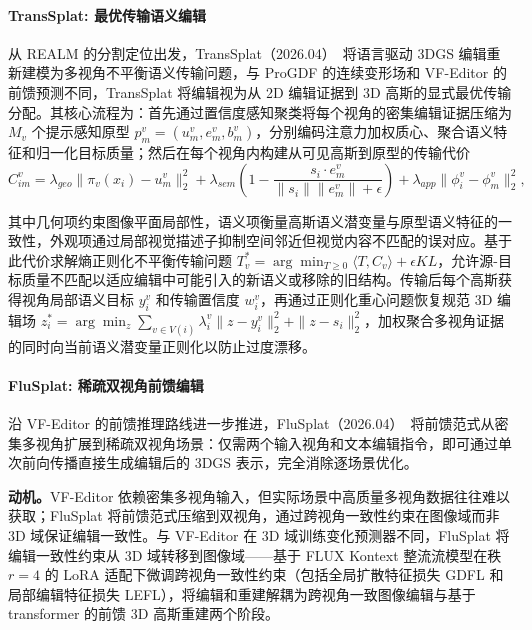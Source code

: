 \paragraph{TransSplat: 最优传输语义编辑}

从 REALM 的分割定位出发，TransSplat（2026.04）~\cite{2604_19571}将语言驱动 3DGS 编辑重新建模为多视角不平衡语义传输问题，与 ProGDF 的连续变形场和 VF-Editor 的前馈预测不同，TransSplat 将编辑视为从 2D 编辑证据到 3D 高斯的显式最优传输分配。其核心流程为：首先通过置信度感知聚类将每个视角的密集编辑证据压缩为 $M_v$ 个提示感知原型 $p_m^v = (u_m^v, e_m^v, b_m^v)$，分别编码注意力加权质心、聚合语义特征和归一化目标质量；然后在每个视角内构建从可见高斯到原型的传输代价
\begin{equation}
C_{im}^v = \lambda_{geo}\|\pi_v(x_i) - u_m^v\|_2^2 + \lambda_{sem}(1 - \frac{s_i \cdot e_m^v}{\|s_i\|\|e_m^v\| + \epsilon}) + \lambda_{app}\|\phi_i^v - \phi_m^v\|_2^2,
\end{equation}

其中几何项约束图像平面局部性，语义项衡量高斯语义潜变量与原型语义特征的一致性，外观项通过局部视觉描述子抑制空间邻近但视觉内容不匹配的误对应。基于此代价求解熵正则化不平衡传输问题 $T_v^* = \arg\min_{T \geq 0} \langle T, C_v \rangle + \epsilon KL$，允许源-目标质量不匹配以适应编辑中可能引入的新语义或移除的旧结构。传输后每个高斯获得视角局部语义目标 $y_i^v$ 和传输置信度 $w_i^v$，再通过正则化重心问题恢复规范 3D 编辑场 $z_i^* = \arg\min_{z} \sum_{v \in V(i)} \lambda_i^v\|z - y_i^v\|_2^2 + \|z - s_i\|_2^2$，加权聚合多视角证据的同时向当前语义潜变量正则化以防止过度漂移。

\paragraph{FluSplat: 稀疏双视角前馈编辑}

沿 VF-Editor 的前馈推理路线进一步推进，FluSplat（2026.04）~\cite{2604_20038}将前馈范式从密集多视角扩展到稀疏双视角场景：仅需两个输入视角和文本编辑指令，即可通过单次前向传播直接生成编辑后的 3DGS 表示，完全消除逐场景优化。

\textbf{动机。}VF-Editor 依赖密集多视角输入，但实际场景中高质量多视角数据往往难以获取；FluSplat 将前馈范式压缩到双视角，通过跨视角一致性约束在图像域而非 3D 域保证编辑一致性。与 VF-Editor 在 3D 域训练变化预测器不同，FluSplat 将编辑一致性约束从 3D 域转移到图像域——基于 FLUX Kontext 整流流模型在秩 $r=4$ 的 LoRA 适配下微调跨视角一致性约束（包括全局扩散特征损失 GDFL 和局部编辑特征损失 LEFL），将编辑和重建解耦为跨视角一致图像编辑与基于 transformer 的前馈 3D 高斯重建两个阶段。

